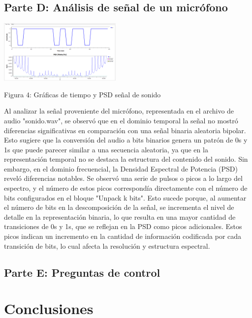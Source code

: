 \documentclass{journal}[IEEEtran, twocolumn]             %
\begin{document}
\begin{multicols}{2}
\subsection{Parte D: Análisis de señal de un micrófono}


    \begin{center}
    \includegraphics[width=0.45\textwidth]{figs/F5.png}
    \caption{Figura 4: Gráficas de tiempo y PSD señal de sonido}
    \end{center}
    
Al analizar la señal proveniente del micrófono, representada en el archivo de audio "sonido.wav", se observó que en el dominio temporal la señal no mostró diferencias significativas en comparación con una señal binaria aleatoria bipolar. Esto sugiere que la conversión del audio a bits binarios genera un patrón de 0s y 1s que puede parecer similar a una secuencia aleatoria, ya que en la representación temporal no se destaca la estructura del contenido del sonido. Sin embargo, en el dominio frecuencial, la Densidad Espectral de Potencia (PSD) reveló diferencias notables. Se observó una serie de pulsos o picos a lo largo del espectro, y el número de estos picos correspondía directamente con el número de bits configurados en el bloque "Unpack k bits". Esto sucede porque, al aumentar el número de bits en la descomposición de la señal, se incrementa el nivel de detalle en la representación binaria, lo que resulta en una mayor cantidad de transiciones de 0s y 1s, que se reflejan en la PSD como picos adicionales. Estos picos indican un incremento en la cantidad de información codificada por cada transición de bits, lo cual afecta la resolución y estructura espectral.

  
\subsection{Parte E: Preguntas de control}




\section{Conclusiones}


\end{multicols}
\end{document}
